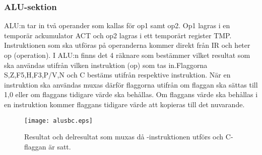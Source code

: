 \documentclass[main.tex]{subfiles}
\begin{document}
\newpage
\subsubsection{ALU-sektion}
ALU:n tar in två operander som kallas för op1 samt op2. Op1 lagras i en
temporär ackumulator ACT och op2 lagras i ett temporärt register TMP.
Instruktionen som ska utföras på operanderna kommer direkt från IR och heter op
(operation). I ALU:n finns det 4 räknare som bestämmer vilket resultat som ska
användas utifrån vilken instruktion (op) som tas in.Flaggorna S,Z,F5,H,F3,P/V,N
och C bestäms utifrån respektive instruktion. När en instruktion ska användas
muxas därför flaggorna utifrån om flaggan ska sättas till 1,0 eller om flaggans
tidigare värde ska behållas. Om flaggans värde ska behållas i en instruktion
kommer flaggans tidigare värde att kopieras till det nuvarande.

\begin{figure}[H]
    \center
    \texttt{[image: alusbc.eps]}
    \caption{Resultat och delresultat som muxas då -instruktionen
    utförs och C-flaggan är satt.}
\end{figure}
\end{document}
